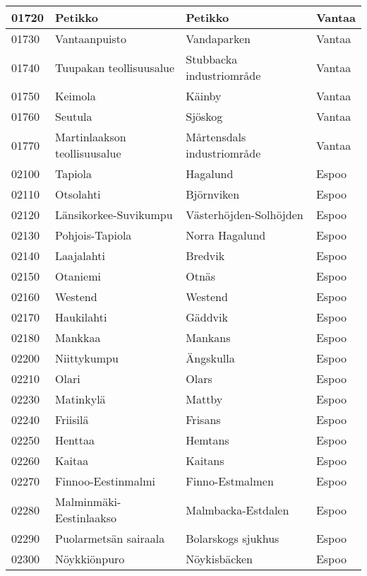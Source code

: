 \begin{longtable}{llll}
    01720 & Petikko & Petikko & Vantaa \\ [0.25ex] \hline
    01730 & Vantaanpuisto & Vandaparken & Vantaa \\ [0.25ex] \hline
    01740 & Tuupakan teollisuusalue & Stubbacka industriområde & Vantaa \\ [0.25ex] \hline
    01750 & Keimola & Käinby & Vantaa \\ [0.25ex] \hline
    01760 & Seutula & Sjöskog & Vantaa \\ [0.25ex] \hline
    01770 & Martinlaakson teollisuusalue & Mårtensdals industriområde & Vantaa \\ [0.25ex] \hline
    02100 & Tapiola & Hagalund & Espoo \\ [0.25ex] \hline
    02110 & Otsolahti & Björnviken & Espoo \\ [0.25ex] \hline
    02120 & Länsikorkee-Suvikumpu & Västerhöjden-Solhöjden & Espoo \\ [0.25ex] \hline
    02130 & Pohjois-Tapiola & Norra Hagalund & Espoo \\ [0.25ex] \hline
    02140 & Laajalahti & Bredvik & Espoo \\ [0.25ex] \hline
    02150 & Otaniemi & Otnäs & Espoo \\ [0.25ex] \hline
    02160 & Westend & Westend & Espoo \\ [0.25ex] \hline
    02170 & Haukilahti & Gäddvik & Espoo \\ [0.25ex] \hline
    02180 & Mankkaa & Mankans & Espoo \\ [0.25ex] \hline
    02200 & Niittykumpu & Ängskulla & Espoo \\ [0.25ex] \hline
    02210 & Olari & Olars & Espoo \\ [0.25ex] \hline
    02230 & Matinkylä & Mattby & Espoo \\ [0.25ex] \hline
    02240 & Friisilä & Frisans & Espoo \\ [0.25ex] \hline
    02250 & Henttaa & Hemtans & Espoo \\ [0.25ex] \hline
    02260 & Kaitaa & Kaitans & Espoo \\ [0.25ex] \hline
    02270 & Finnoo-Eestinmalmi & Finno-Estmalmen & Espoo \\ [0.25ex] \hline
    02280 & Malminmäki-Eestinlaakso & Malmbacka-Estdalen & Espoo \\ [0.25ex] \hline
    02290 & Puolarmetsän sairaala & Bolarskogs sjukhus & Espoo \\ [0.25ex] \hline
    02300 & Nöykkiönpuro & Nöykisbäcken & Espoo \\ [0.25ex] \hline

\end{longtable}
